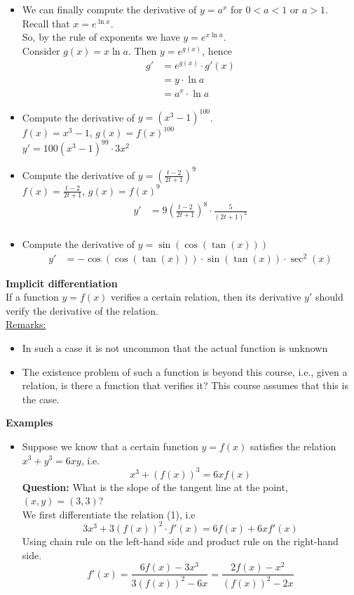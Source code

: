 \documentclass[]{article}
\begin{document}
	\begin{itemize}
		\item We can finally compute the derivative of $y=a^x$ for $0<a<1$ or $a>1$.\\
		Recall that $x=e^{\ln x}$.\\
		So, by the rule of exponents we have $y=e^{x\ln a}$.\\
		Consider $g(x)=x\ln a$. Then $y=e^{g(x)}$, hence
		\begin{align*}
			g'&=e^{g(x)}\cdot g'(x)\\
			&=y\cdot\ln a\\
			&=a^x\cdot\ln a
		\end{align*}
		\item Compute the derivative of $y=(x^3-1)^{100}$.\\
		$f(x)=x^3-1$, $g(x)=f(x)^{100}$\\
		$y'=100(x^3-1)^{99}\cdot 3x^2$
		\item Compute the derivative of $y=\left(\frac{t-2}{2t+1}\right)^9$\\
		$f(x)=\frac{t-2}{2t+1}$, $g(x)=f(x)^9$
		\begin{align*}
			y'&=9\left(\frac{t-2}{2t+1}\right)^8\cdot \frac{5}{(2t+1)^2}\\
		\end{align*}
		\item Compute the derivative of $y=\sin(\cos(\tan(x)))$
		\begin{align*}
			y'&=-\cos(\cos(\tan(x)))\cdot\sin(\tan(x))\cdot\sec^2(x)
		\end{align*}
	\end{itemize}
	\large{\bf Implicit differentiation}\\
	If a function $y=f(x)$ verifies a certain relation, then its derivative $y'$ should verify the derivative of the relation.\\
	\underline{Remarks:}
	\begin{itemize}
		\item In such a case it is not uncommon that the actual function is unknown
		\item The existence problem of such a function is beyond this course, i.e., given a relation, is there a function that verifies it? This course assumes that this is the case.
	\end{itemize}
	\large{\bf Examples}
	\normalsize
	\begin{itemize}
		\item Suppose we know that a certain function $y=f(x)$ satisfies the relation $x^3+y^3=6xy$, i.e.
		$$
			x^3+(f(x))^3=6xf(x)
		$$
		{\bf Question:} What is the slope of the tangent line at the point, $(x,y)=(3,3)$?\\
		We first differentiate the relation (1), i.e
		$$
			3x^3+3(f(x))^2\cdot f'(x)=6f(x)+6xf'(x)
		$$
		Using chain rule on the left-hand side and product rule on the right-hand side.
		$$
			f'(x)=\frac{6f(x)-3x^3}{3(f(x))^2-6x}=\frac{2f(x)-x^2}{(f(x))^2-2x}
		$$
	\end{itemize}
\end{document}
